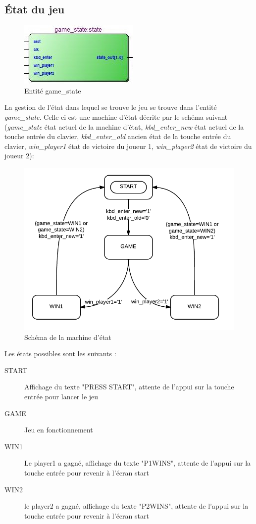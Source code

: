 \subsection{État du jeu}
\begin{figure}[h!]
	\centering
	\includegraphics[scale=1.0]{images/gamestate.jpg}
	\caption{Entité game\_state}
	\label{fig:gamestate}
\end{figure}
La gestion de l'état dans lequel se trouve le jeu se trouve dans l'entité \emph{game\_state}. Celle-ci est une machine
d'état décrite par le schéma suivant (\emph{game\_state} état actuel de la machine d'état, \emph{kbd\_enter\_new} état actuel de la touche entrée du clavier, \emph{kbd\_enter\_old} ancien état de la touche entrée du clavier, \emph{win\_player1} état de victoire du joueur 1, \emph{win\_player2} état de victoire du joueur 2):
\begin{figure}[h!]
	\centering
	\includegraphics[scale=0.5]{images/BasicStateDiagram.png}
	\caption{Schéma de la machine d'état}
	\label{fig:statemachine}
\end{figure}

Les états possibles sont les suivants :
\begin{description}
\item[START] Affichage du texte "PRESS START", attente de l'appui sur la touche entrée pour lancer le jeu
\item[GAME] Jeu en fonctionnement
\item[WIN1] Le player1 a gagné, affichage du texte "P1WINS", attente de l'appui sur la touche entrée pour revenir à l'écran start
\item[WIN2] le player2 a gagné, affichage du texte "P2WINS", attente de l'appui sur la touche entrée pour revenir à l'écran start
\end{description}

